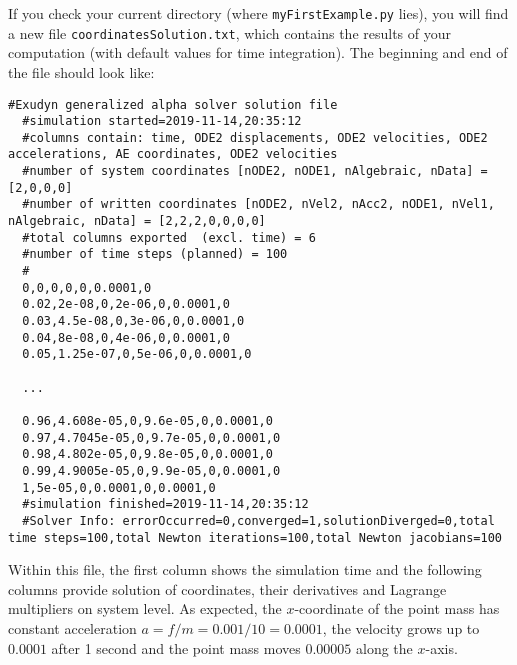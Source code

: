 If you check your current directory (where \texttt{myFirstExample.py} lies), you will find a new file \texttt{coordinatesSolution.txt}, which contains the results of your computation (with default values for time integration).
The beginning and end of the file should look like: \vspace{6pt}\\
{\ttfamily \footnotesize
\begin{lstlisting}[breaklines=true]
  #Exudyn generalized alpha solver solution file
  #simulation started=2019-11-14,20:35:12
  #columns contain: time, ODE2 displacements, ODE2 velocities, ODE2 accelerations, AE coordinates, ODE2 velocities
  #number of system coordinates [nODE2, nODE1, nAlgebraic, nData] = [2,0,0,0]
  #number of written coordinates [nODE2, nVel2, nAcc2, nODE1, nVel1, nAlgebraic, nData] = [2,2,2,0,0,0,0]
  #total columns exported  (excl. time) = 6
  #number of time steps (planned) = 100
  #
  0,0,0,0,0,0.0001,0
  0.02,2e-08,0,2e-06,0,0.0001,0
  0.03,4.5e-08,0,3e-06,0,0.0001,0
  0.04,8e-08,0,4e-06,0,0.0001,0
  0.05,1.25e-07,0,5e-06,0,0.0001,0

  ...

  0.96,4.608e-05,0,9.6e-05,0,0.0001,0
  0.97,4.7045e-05,0,9.7e-05,0,0.0001,0
  0.98,4.802e-05,0,9.8e-05,0,0.0001,0
  0.99,4.9005e-05,0,9.9e-05,0,0.0001,0
  1,5e-05,0,0.0001,0,0.0001,0
  #simulation finished=2019-11-14,20:35:12
  #Solver Info: errorOccurred=0,converged=1,solutionDiverged=0,total time steps=100,total Newton iterations=100,total Newton jacobians=100
\end{lstlisting}
}

Within this file, the first column shows the simulation time and the following columns provide solution of coordinates, their derivatives and Lagrange multipliers on system level. As expected, the $x$-coordinate of the point mass has constant acceleration $a=f/m=0.001/10=0.0001$, the velocity grows up to $0.0001$ after 1 second and the point mass moves $0.00005$ along the $x$-axis.
%

